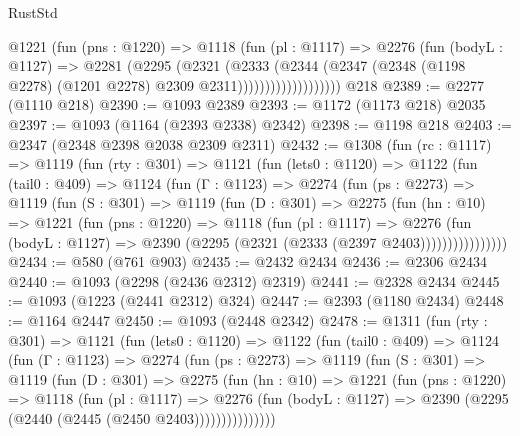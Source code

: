 \begin{lexlean}{RustStd}
\begin{coremodule}
                      @1221
                        (fun (pns : @1220) =>
                        @1118
                          (fun (pl : @1117) =>
                          @2276
                            (fun (bodyL : @1127) =>
                            @2281
                              (@2295
                                (@2321
                                  (@2333
                                    (@2344
                                      (@2347
                                        (@2348
                                          (@1198 @2278)
                                          (@1201 @2278)
                                          @2309
                                          @2311)))))))))))))))))))
    @218
@2389 := @2277 (@1110 @218)
@2390 := @1093 @2389
@2393 := @1172 (@1173 @218) @2035
@2397 := @1093 (@1164 (@2393 @2338) @2342)
@2398 := @1198 @218
@2403 := @2347 (@2348 @2398 @2038 @2309 @2311)
@2432 := @1308
    (fun (rc : @1117) =>
    @1119
      (fun (rty : @301) =>
      @1121
        (fun (lets0 : @1120) =>
        @1122
          (fun (tail0 : @409) =>
          @1124
            (fun (Γ : @1123) =>
            @2274
              (fun (ps : @2273) =>
              @1119
                (fun (S : @301) =>
                @1119
                  (fun (D : @301) =>
                  @2275
                    (fun (hn : @10) =>
                    @1221
                      (fun (pns : @1220) =>
                      @1118
                        (fun (pl : @1117) =>
                        @2276
                          (fun (bodyL : @1127) =>
                          @2390 (@2295 (@2321 (@2333 (@2397 @2403))))))))))))))))
@2434 := @580 (@761 @903)
@2435 := @2432 @2434
@2436 := @2306 @2434
@2440 := @1093 (@2298 (@2436 @2312) @2319)
@2441 := @2328 @2434
@2445 := @1093 (@1223 (@2441 @2312) @324)
@2447 := @2393 (@1180 @2434)
@2448 := @1164 @2447
@2450 := @1093 (@2448 @2342)
@2478 := @1311
    (fun (rty : @301) =>
    @1121
      (fun (lets0 : @1120) =>
      @1122
        (fun (tail0 : @409) =>
        @1124
          (fun (Γ : @1123) =>
          @2274
            (fun (ps : @2273) =>
            @1119
              (fun (S : @301) =>
              @1119
                (fun (D : @301) =>
                @2275
                  (fun (hn : @10) =>
                  @1221
                    (fun (pns : @1220) =>
                    @1118
                      (fun (pl : @1117) =>
                      @2276
                        (fun (bodyL : @1127) =>
                        @2390 (@2295 (@2440 (@2445 (@2450 @2403)))))))))))))))

\end{coremodule}
\end{lexlean}
